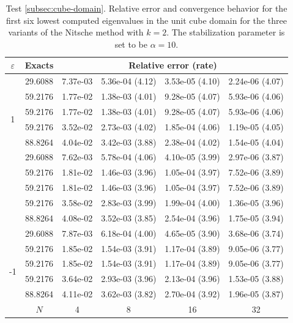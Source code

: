 \documentclass[onefignum,onetabnum,final]{siamart250211}
\numberwithin{equation}{section}
\newcommand\0{\boldsymbol{0}}
\begin{document}
	\begin{table}[!hbt]
		\centering
		{\setlength{\tabcolsep}{3.8pt}\footnotesize
			\caption{Test \ref{subsec:cube-domain}. Relative error and convergence behavior for the first six lowest computed eigenvalues in the unit cube domain for the three variants of the Nitsche method with $k=2$. The stabilization parameter is set to be $\alpha=10$.}
			\label{tabla:cube-convergence-k2}
			\begin{tabular}{|c|c|cccc|}
				\hline
				$\varepsilon$& Exacts & \multicolumn{4}{c|}{Relative error (rate)} \\
				\hline
				\multirow{6}{0.02\linewidth}{1}&   29.6088 &   7.37e-03  &   5.36e-04 (4.12) &   3.53e-05 (4.10) &   2.24e-06 (4.07)   \\
				&   59.2176 &   1.77e-02  &   1.38e-03 (4.01) &   9.28e-05 (4.07) &   5.93e-06 (4.06)   \\
				&   59.2176 &   1.77e-02  &   1.38e-03 (4.01) &   9.28e-05 (4.07) &   5.93e-06 (4.06)   \\
				&   59.2176 &   3.52e-02  &   2.73e-03 (4.02) &   1.85e-04 (4.06) &   1.19e-05 (4.05)   \\
				&   88.8264 &   4.04e-02  &   3.42e-03 (3.88) &   2.38e-04 (4.02) &   1.54e-05 (4.04)   \\
				\hline
				\multirow{6}{0.02\linewidth}{0}&   29.6088 &   7.62e-03  &   5.78e-04 (4.06) &   4.10e-05 (3.99) &   2.97e-06 (3.87)   \\
				&   59.2176 &   1.81e-02  &   1.46e-03 (3.96) &   1.05e-04 (3.97) &   7.52e-06 (3.89)   \\
				&   59.2176 &   1.81e-02  &   1.46e-03 (3.96) &   1.05e-04 (3.97) &   7.52e-06 (3.89)   \\
				&   59.2176 &   3.58e-02  &   2.83e-03 (3.99) &   1.99e-04 (4.00) &   1.36e-05 (3.96)   \\
				&   88.8264 &   4.08e-02  &   3.52e-03 (3.85) &   2.54e-04 (3.96) &   1.75e-05 (3.94)   \\
				\hline
				\multirow{6}{0.02\linewidth}{-1}&   29.6088 &   7.87e-03  &   6.18e-04 (4.00) &   4.65e-05 (3.90) &   3.68e-06 (3.74)   \\
				&   59.2176 &   1.85e-02  &   1.54e-03 (3.91) &   1.17e-04 (3.89) &   9.05e-06 (3.77)   \\
				&   59.2176 &   1.85e-02  &   1.54e-03 (3.91) &   1.17e-04 (3.89) &   9.05e-06 (3.77)   \\
				&   59.2176 &   3.64e-02  &   2.93e-03 (3.96) &   2.13e-04 (3.96) &   1.53e-05 (3.88)   \\
				&   88.8264 &   4.11e-02  &   3.62e-03 (3.82) &   2.70e-04 (3.92) &   1.96e-05 (3.87)   \\
				\hline
				&$N$&4&8&16 &32\\
				\hline
				\hline
		\end{tabular}}
	\end{table}
	
\end{document}
